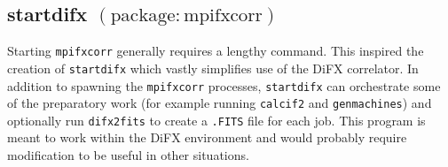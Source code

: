 
\subsection{startdifx {\small $\mathrm{(package: mpifxcorr)}$}} \label{sec:startdifx} 

Starting {\tt mpifxcorr} generally requires a lengthy command.
This inspired the creation of {\tt startdifx} which vastly simplifies use of the DiFX correlator.
In addition to spawning the {\tt mpifxcorr} processes, {\tt startdifx} can orchestrate some of the preparatory work (for example running {\tt calcif2} and {\tt genmachines}) and optionally run {\tt difx2fits} to create a {\tt .FITS} file for each job.
This program is meant to work within the DiFX environment and would probably require modification to be useful in other situations.

